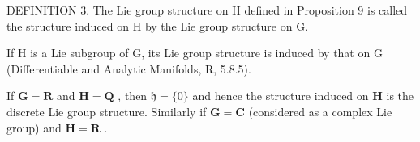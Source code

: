 DEFINITION 3. The Lie group structure on H defined in Proposition 9 is called the structure induced on H by the Lie group structure on G.

If H is a Lie subgroup of G, its Lie group structure is induced by that on G (Differentiable and Analytic Manifolds, R, 5.8.5).

If \(\mathbf{G} = \mathbf{R}\) and \(\mathbf{H} = \mathbf{Q}\) , then \(\mathfrak{h} = \{0\}\) and hence the structure induced on \(\mathbf{H}\) is the discrete Lie group structure. Similarly if \(\mathbf{G} = \mathbf{C}\) (considered as a complex Lie group) and \(\mathbf{H} = \mathbf{R}\) .
\relax{}
